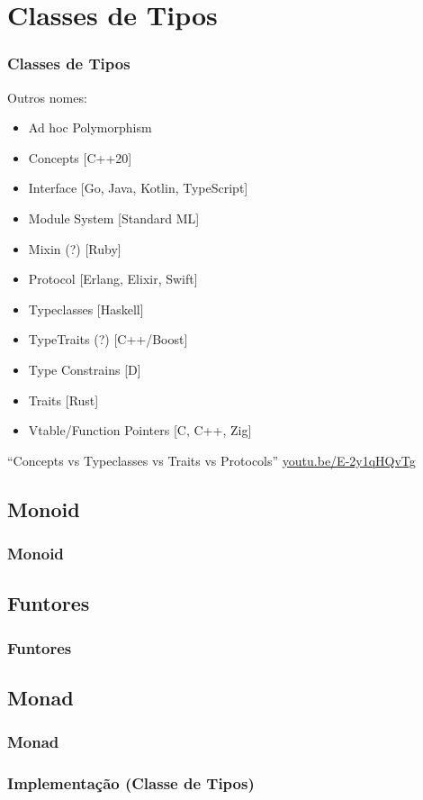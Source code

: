 \documentclass{beamer}
\begin{document}
\section{Classes de Tipos}
\begin{frame}
    \frametitle{Classes de Tipos}
    Outros nomes:
    \begin{itemize}
        \item Ad hoc Polymorphism
        \item Concepts [C++20]
        \item Interface [Go, Java, Kotlin, TypeScript]
        \item Module System [Standard ML]
        \item Mixin (?) [Ruby]
        \item Protocol [Erlang, Elixir, Swift]
        \item Typeclasses [Haskell]
        \item TypeTraits (?) [C++/Boost]
        \item Type Constrains [D]
        \item Traits [Rust]
        \item Vtable/Function Pointers [C, C++, Zig]
    \end{itemize}
    \vfill
    ``Concepts vs Typeclasses vs Traits vs Protocols''
    \url{youtu.be/E-2y1qHQvTg}
\end{frame}

\subsection{Monoid}
\begin{frame}
    \frametitle{Monoid}
\end{frame}

\subsection{Funtores}
\begin{frame}
    \frametitle{Funtores}
\end{frame}

\subsection{Monad}
\begin{frame}
    \frametitle{Monad}
\end{frame}

\begin{frame}
    \frametitle{Implementação (Classe de Tipos)}
\end{frame}
\end{document}
